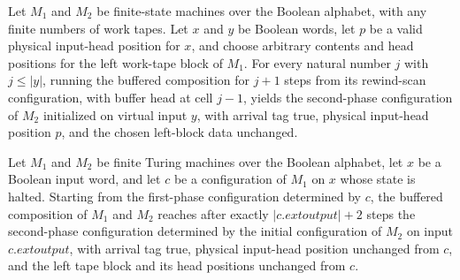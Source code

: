 \begin{lemma}
\label{Turing.FinTM.bufferedScanCfg_run}
\leanok
{}
Let $M_1$ and $M_2$ be finite-state machines over the Boolean alphabet, with any finite
numbers of work tapes. Let $x$ and $y$ be Boolean words, let $p$ be a valid physical
input-head position for $x$, and choose arbitrary contents and head positions for the
left work-tape block of $M_1$. For every natural number $j$ with $j\le |y|$, running the
buffered composition for $j+1$ steps from its rewind-scan configuration, with buffer
head at cell $j-1$, yields the second-phase configuration of $M_2$ initialized on
virtual input $y$, with arrival tag true, physical input-head position $p$, and the
chosen left-block data unchanged.
\end{lemma}

\begin{lemma}
\label{Turing.FinTM.bufferedFirstCfg_rewind}
\leanok
{}
Let $M_1$ and $M_2$ be finite Turing machines over the Boolean alphabet, let $x$ be a
Boolean input word, and let $c$ be a configuration of $M_1$ on $x$ whose state is
halted. Starting from the first-phase configuration determined by $c$, the buffered
composition of $M_1$ and $M_2$ reaches after exactly $|c.	ext{output}|+2$ steps the
second-phase configuration determined by the initial configuration of $M_2$ on input
$c.	ext{output}$, with arrival tag true, physical input-head position unchanged from
$c$, and the left tape block and its head positions unchanged from $c$.
\end{lemma}

